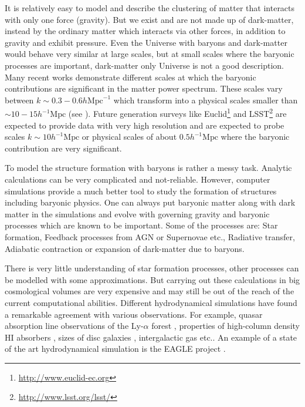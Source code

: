 It is relatively easy to model and describe the clustering of matter that interacts with only 
one force (gravity). But we exist and are not made up of dark-matter, instead by the
ordinary matter which interacts via other forces, in addition to gravity and exhibit pressure. 
Even the Universe with baryons and dark-matter would behave very similar at large scales,
but at small scales where the baryonic processes are important, dark-matter only Universe is
not a good description. Many recent works demonstrate different scales at which the baryonic
contributions are significant in the matter power spectrum. These scales vary between
$k\sim 0.3-0.6 h \mathrm{Mpc}^{-1}$ which transform into a physical scales smaller than
$\sim 10-15 h^{-1} \mathrm{Mpc}$ (see \cite{2011MNRAS.415.3649V,2014MNRAS.440.2997V}). 
Future generation surveys like Euclid\footnote{\url{http://www.euclid-ec.org}} 
\cite{2010arXiv1001.0061R,2013LRR....16....6A} and LSST\footnote{\url{http://www.lsst.org/lsst/}} 
\cite{2009arXiv0912.0201L} are
expected to provide data with very high resolution and are expected to probe scales 
$k \sim 10 h^{-1}\mathrm{Mpc}$
or physical scales of about $0.5 h^{-1} \mathrm{Mpc}$ where the baryonic contribution 
are very significant.

To model the structure formation with baryons is rather a messy task. Analytic calculations
can be very complicated and not-reliable. 
However, computer simulations provide a much better tool to study the
formation of structures including baryonic physics. 
One can always
put baryonic matter along with dark matter in the simulations and evolve with governing gravity and
baryonic processes which are known to be important. Some of the processes are: 
Star formation,
Feedback processes from AGN or Supernovae etc.,
Radiative transfer,
Adiabatic contraction or expansion of dark-matter due to baryons.

There is very little understanding of star formation processes, other processes can be 
modelled with some approximations. But carrying out these calculations in big cosmological 
volumes are very expensive and may still be out of the reach of the current computational 
abilities. 
Different hydrodynamical simulations have found a remarkable agreement
with various observations. For example, quasar absorption line observations
of the Ly-$\alpha$ forest \cite{1994ApJ...437L...9C,1998MNRAS.297L..49T,1998ApJ...495...44C}, 
properties of high-column density HI absorbers \cite{2008MNRAS.390.1349P,
2011ApJ...743...82M,2013MNRAS.430.2427R}, sizes of disc galaxies \cite{2004ApJ...607..688G,
2011MNRAS.410.1391A,2011ApJ...742...76G,2013MNRAS.436.3031V,2014MNRAS.437.1750M}, intergalactic
gas \cite{2012MNRAS.420..829O,2012MNRAS.425.1270S} etc.. An example of a state of the art 
hydrodynamical simulation is the
EAGLE project \cite{2015MNRAS.446..521S}. 


